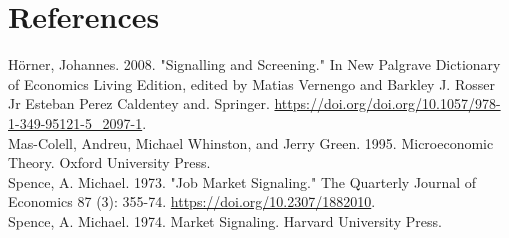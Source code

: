 \documentclass[10pt]{article}
\begin{document}
\section*{References}
Hörner, Johannes. 2008. "Signalling and Screening." In New Palgrave Dictionary of Economics Living Edition, edited by Matias Vernengo and Barkley J. Rosser Jr Esteban Perez Caldentey and. Springer. \href{https://doi.org/doi.org/10.1057/978-1-349-95121-5_2097-1}{https://doi.org/doi.org/10.1057/978-1-349-95121-5\_2097-1}.\\
Mas-Colell, Andreu, Michael Whinston, and Jerry Green. 1995. Microeconomic Theory. Oxford University Press.\\
Spence, A. Michael. 1973. "Job Market Signaling." The Quarterly Journal of Economics 87 (3): 355-74. \href{https://doi.org/10.2307/1882010}{https://doi.org/10.2307/1882010}.\\
Spence, A. Michael. 1974. Market Signaling. Harvard University Press.
\end{document}
